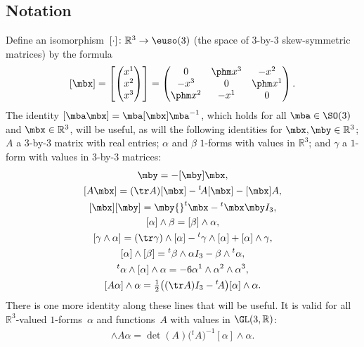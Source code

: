 \subsection{Notation}
Define an isomorphism~$[{\cdot}]\colon \mathbb{R}^3\to\euso(3)$
(the space of $3$-by-$3$ skew-symmetric matrices) by the formula
\begin{gather*}%
\left[ \mbx \right]
= \left[\begin{pmatrix}x^1\\x^2\\x^3\end{pmatrix}\right]
= \begin{pmatrix}
 0 & \phm x^3 & -x^2\\
 -x^3 & 0 & \phm x^1\\
 \phm x^2 & -x^1 & 0
 \end{pmatrix}.
\end{gather*}
The identity $[\mba \mbx] = \mba[\mbx]\mba^{-1}$,
which holds for all $\mba\in\SO(3)$ and $\mbx\in\mathbb{R}^3$,
will be useful, as will the following identities
for $\mbx, \mby\in\mathbb{R}^3$;
$A$ a $3$-by-$3$ matrix with real entries;
$\alpha$ and $\beta$ $1$-forms with values in $\mathbb{R}^3$;
and $\gamma$ a $1$-form with values in $3$-by-$3$ matrices:
\begin{gather}
 [\mbx] \mby = - [\mby] \mbx,\nonumber\\
[A\mbx] = (\tr A) [\mbx] - {}^t\!A [\mbx] - [\mbx] A,\nonumber\\
[\mbx][\mby] = \mby {}^t\mbx - {}^t\mbx \mby I_3,\nonumber\\
[\alpha ]\wedge\beta = [\beta]\wedge\alpha,\nonumber\\
[\gamma\wedge\alpha] = (\tr\gamma)\wedge[\alpha]-{}^t\gamma\wedge[\alpha]+[\alpha]\wedge\gamma,\nonumber\\
[\alpha]\wedge [\beta] = {}^t\beta\wedge\alpha I_3 - \beta\wedge {}^t\alpha,\nonumber\\
{}^t\alpha\wedge[\alpha]\wedge\alpha = - 6 \alpha^1\wedge\alpha^2\wedge\alpha^3,\nonumber\\
[A \alpha]\wedge\alpha = \tfrac12\bigl((\tr A) I_3 - {}^t\!A\bigr) [\alpha]\wedge\alpha.\label{eq: crossproductidentities}
\end{gather}
There is one more identity along these lines that will be useful. It is valid for all $\mathbb{R}^3$-valued $1$-forms~$\alpha$ and functions~$A$ with values in $\GL(3,\mathbb{R})$:
\begin{gather*}
[A\alpha]\wedge A\alpha = \det(A) \big({}^t\!A\big)^{-1} [\alpha]\wedge\alpha.
\end{gather*}

